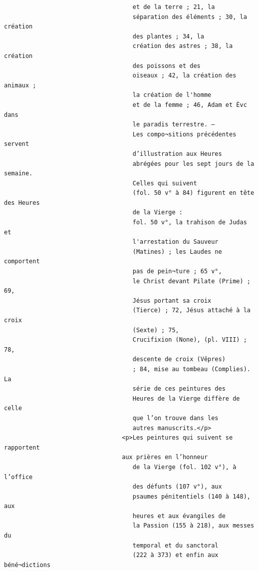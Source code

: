 \documentclass[a4paper,12pt,twoside]{book}
\begin{document}
\begin{verbatim}
                                    et de la terre ; 21, la
                                    séparation des éléments ; 30, la création 
                                    des plantes ; 34, la
                                    création des astres ; 38, la création 
                                    des poissons et des
                                    oiseaux ; 42, la création des animaux ;
                                    la création de l'homme
                                    et de la femme ; 46, Adam et Èvc dans 
                                    le paradis terrestre. —
                                    Les compo¬sitions précédentes servent 
                                    d’illustration aux Heures
                                    abrégées pour les sept jours de la semaine.
                                    Celles qui suivent
                                    (fol. 50 v° à 84) figurent en tête des Heures
                                    de la Vierge :
                                    fol. 50 v°, la trahison de Judas et 
                                    l'arrestation du Sauveur
                                    (Matines) ; les Laudes ne comportent 
                                    pas de pein¬ture ; 65 v°,
                                    le Christ devant Pilate (Prime) ; 69,
                                    Jésus portant sa croix
                                    (Tierce) ; 72, Jésus attaché à la croix
                                    (Sexte) ; 75,
                                    Crucifixion (None), (pl. VIII) ; 78, 
                                    descente de croix (Vêpres)
                                    ; 84, mise au tombeau (Complies). La 
                                    série de ces peintures des
                                    Heures de la Vierge diffère de celle
                                    que l’on trouve dans les
                                    autres manuscrits.</p>
                                 <p>Les peintures qui suivent se rapportent
                                 aux prières en l’honneur
                                    de la Vierge (fol. 102 v°), à l’office
                                    des défunts (107 v°), aux
                                    psaumes pénitentiels (140 à 148), aux 
                                    heures et aux évangiles de
                                    la Passion (155 à 218), aux messes du 
                                    temporal et du sanctoral
                                    (222 à 373) et enfin aux béné¬dictions

\end{verbatim}
\end{document}
